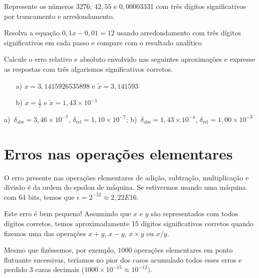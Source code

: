 \documentclass[main.tex]{subfiles}
\begin{document}
\begin{Exercise}  Represente os números $3276$; $42,55$ e $0,00003331$ com três dígitos significativos por truncamento e arredondamento.
\end{Exercise}

\begin{Exercise} Resolva a equação $0,1x-0,01=12$ usando arredondamento com três dígitos significativos em cada passo e compare com o resultado analítico
\end{Exercise}


\begin{Exercise} Calcule o erro relativo e absoluto envolvido nas seguintes aproximações e expresse as respostas com três algarismos significativos corretos.
    \begin{itemize}
    \item [a)] $x=3,1415926535898$ e $\tilde{x}=3,141593$
    \item [b)] $x=\frac{1}{7}$ e $\tilde{x}=1,43\times 10^{-1}$
    \end{itemize}
\end{Exercise}
\begin{Answer}
  \begin{tiny}
    a)~$\delta_{\mbox{abs}}=3,46\times 10^{-7}$, $\delta_{\mbox{rel}}=1,10\times 10^{-7}$; b)~$\delta_{\mbox{abs}}=1,43\times 10^{-4}$, $\delta_{\mbox{rel}} = 1,00 \times 10^{-3}$
  \end{tiny}
\end{Answer}


\section{Erros nas operações elementares}
O erro presente nas operações elementares de adição, subtração, multiplicação e divisão é da ordem do epsilon de máquina. Se estivermos usando uma máquina com 64 bits, temos que $\epsilon = 2^{-52} \approx 2,22E16$. 

Este erro é bem pequeno! Assumindo que $x$ e $y$ são representados com todos dígitos corretos, temos aproximadamente 15 dígitos significativos corretos quando fizemos uma das operações $x+y$, $x-y$, $x\times y$ ou $x/y$. 


Mesmo que fizéssemos, por exemplo, $1000$ operações elementares em ponto flutuante sucessivas, teríamos no pior dos casos acumulado todos esses erros e perdido $3$ casas decimais ($1000\times 10^{-15} \approx 10^{-12})$.
\end{document}
